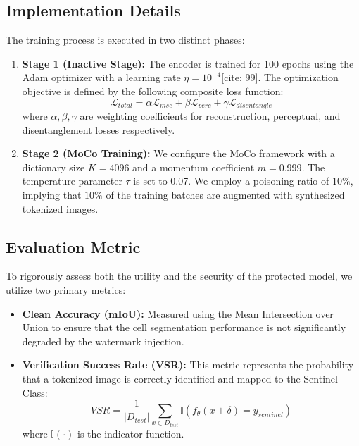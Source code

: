 \documentclass[10pt,twocolumn,letterpaper]{article}
\begin{document}
\subsection{Implementation Details}
The training process is executed in two distinct phases:
\begin{enumerate}
    \item \textbf{Stage 1 (Inactive Stage):} The encoder is trained for 100 epochs using the Adam optimizer with a learning rate $\eta = 10^{-4}$[cite: 99]. The optimization objective is defined by the following composite loss function:
    \begin{equation}
        \mathcal{L}_{total} = \alpha \mathcal{L}_{mse} + \beta \mathcal{L}_{perc} + \gamma \mathcal{L}_{disentangle}
    \end{equation}
    where $\alpha, \beta, \gamma$ are weighting coefficients for reconstruction, perceptual, and disentanglement losses respectively.
    \item \textbf{Stage 2 (MoCo Training):} We configure the MoCo framework with a dictionary size $K = 4096$ and a momentum coefficient $m = 0.999$. The temperature parameter $\tau$ is set to 0.07. We employ a poisoning ratio of $10\%$, implying that $10\%$ of the training batches are augmented with synthesized tokenized images.
\end{enumerate}

\subsection{Evaluation Metric}
To rigorously assess both the utility and the security of the protected model, we utilize two primary metrics:
\begin{itemize}
    \item \textbf{Clean Accuracy (mIoU):} Measured using the Mean Intersection over Union to ensure that the cell segmentation performance is not significantly degraded by the watermark injection.
    \item \textbf{Verification Success Rate (VSR):} This metric represents the probability that a tokenized image is correctly identified and mapped to the Sentinel Class:
    \begin{equation}
        VSR = \frac{1}{|D_{test}|} \sum_{x \in D_{test}} \mathbb{I}(f_\theta(x + \delta) = y_{sentinel})
    \end{equation}
    where $\mathbb{I}(\cdot)$ is the indicator function.
\end{itemize}
\end{document}
